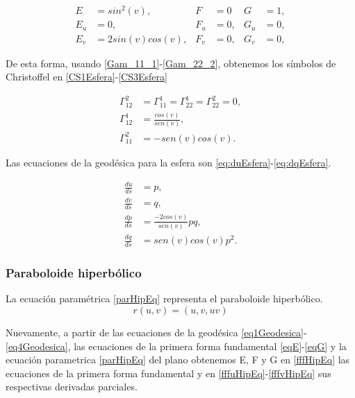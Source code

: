\documentclass{endm}
\begin{document}
\begin{align}
E&=sin^2 (v),   & F &=0    & G&=1, \label{fffEsfera} \\
E_u&=0,     & F_u&=0,   & G_u&=0, \label{fffuEsfera}\\
E_v&=2sin(v)cos(v),    & F_v&=0,   & G_v&=0, \label{fffvEsfera}
\end{align}

De esta forma, usando \ref{Gam_11_1}-\ref{Gam_22_2}, obtenemos los s\'imbolos de Christoffel en \ref{CS1Esfera}-\ref{CS3Esfera}

\begin{align}
\Gamma_{12}^2&=\Gamma_{11}^1=\Gamma_{22}^1=\Gamma_{22}^2=0, \label{CS1Esfera} \\
\Gamma_{12}^1&=\frac{cos(v)}{sen(v)},  \label{CS2Esfera}   \\
\Gamma_{11}^2&=-sen(v)cos(v) .  \label{CS3Esfera}
\end{align}

Las ecuaciones de la geod\'esica para la esfera son \ref{eq:duEsfera}-\ref{eq:dqEsfera}.

\begin{align}
\frac{du}{ds}&=p,\label{eq:duEsfera} \\
\frac{dv}{ds}&=q,\label{eq:dvEsfera}     \\
\frac{dp}{ds}&=\frac{-2cos(v)}{sen(v)} pq, \label{eq:dpEsfera}\\ 
\frac{dq}{ds}&= sen(v)cos(v) p^2. \label{eq:dqEsfera}
\end{align}

\subsubsection{Paraboloide hiperb\'olico}

La ecuaci\'on param\'etrica \ref{parHipEq} representa el paraboloide hiperb\'olico.
\begin{equation} \label{parHipEq}
r(u,v) = (u,v,uv)
\end{equation}

Nuevamente, a partir de las ecuaciones de la geod\'esica \ref{eq1Geodesica}-\ref{eq4Geodesica}, las ecuaciones de la primera forma fundamental \ref{eqE}-\ref{eqG} y la ecuaci\'on parametrica \ref{parHipEq} del plano obtenemos E, F y G en \ref{fffHipEq} las ecuaciones de la primera forma fundamental y en \ref{fffuHipEq}-\ref{fffvHipEq} sus respectivas derivadas parciales.
\end{document}
